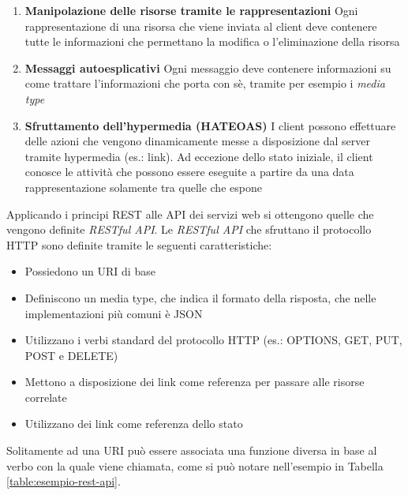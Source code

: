 \begin{itemize}
\begin{enumerate}
		\item \textbf{Manipolazione delle risorse tramite le rappresentazioni} Ogni rappresentazione di una risorsa che viene inviata al client deve contenere tutte le informazioni che permettano la modifica o l'eliminazione della risorsa
		\item \textbf{Messaggi autoesplicativi} Ogni messaggio deve contenere informazioni su come trattare l'informazioni che porta con sè, tramite per esempio i \emph{media type}
		\item \textbf{Sfruttamento dell'hypermedia (HATEOAS)} I client possono effettuare delle azioni che vengono dinamicamente messe a disposizione dal server tramite hypermedia (es.: link). Ad eccezione dello stato iniziale, il client conosce le attività che possono essere eseguite a partire da una data rappresentazione solamente tra quelle che espone
	\end{enumerate}
\end{itemize}

Applicando i principi REST alle API dei servizi web si ottengono quelle che vengono definite \emph{RESTful API}. Le \emph{RESTful API} che sfruttano il protocollo HTTP sono definite tramite le seguenti caratteristiche:

\begin{itemize}
	\item Possiedono un URI di base
	\item Definiscono un media type, che indica il formato della risposta, che nelle implementazioni più comuni è JSON
	\item Utilizzano i verbi standard del protocollo HTTP (es.: OPTIONS, GET, PUT, POST e DELETE)
	\item Mettono a disposizione dei link come referenza per passare alle risorse correlate
	\item Utilizzano dei link come referenza dello stato
\end{itemize}

Solitamente ad una URI può essere associata una funzione diversa in base al verbo con la quale viene chiamata, come si può notare nell'esempio in Tabella \ref{table:esempio-rest-api}.

